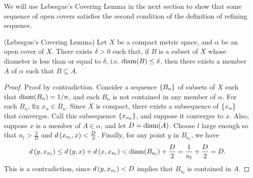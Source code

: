 \documentclass[12pt,twoside,draft]{book}
\begin{document}
We will use Lebesgue's Covering Lemma in the next section to show that some sequence of open covers satisfies the second condition of the definition of refining sequence.
\begin{lemma}
  (Lebesgue's Covering Lemma)
  Let $X$ be a compact metric space, and $\alpha$ be an open cover of $X$.
  There exists $\delta > 0$ such that, if $B$ is a subset of $X$ whose diameter is less than or equal to $\delta$, i.e. $\mathrm{diam}(B) \leq \delta$, then there exists a member $A$ of $\alpha$ such that $B \subseteq A$.
  \label{lem:covering}

    \begin{proof}
    Proof by contradiction.
    Consider a sequence $\left \{ B_n \right \}$ of subsets of $X$ such that $\mathrm{diam}(B_n) = 1/n$, and each $B_n$ is not contained in any member of $\alpha$.
    For each $B_n$, fix $x_n \in B_n$.
    Since $X$ is compact, there exists a subsequence of $\left \{ x_n \right \}$ that converges.
    Call this subsequence $\left \{ x_{n_k} \right \}$, and suppose it converges to $x$.
    Also, suppose $x$ is a member of $A \in \alpha$, and let $D = \mathrm{diam}(A)$.
    Choose $l$ large enough so that $n_l > \frac{2}{D}$ and $d\left( x_{n_l}, x \right) < \frac{D}{2}$.
    Finally, for any point $y$ in $B_{n_l}$, we have
    \begin{equation*}
      d\left( y, x_{n_l} \right)
      \leq d\left( y,x \right) + d\left( x, x_{n_l} \right)
      < \mathrm{diam}(B_{n_l})  + \frac{D}{2}
      = \frac{1}{n_l} + \frac{D}{2}
      = D.
    \end{equation*}
    This is a contradiction, since $d\left( y, x_{n_l} \right) < D$ implies that $B_{n_l}$ is contained in $A$.
  \end{proof}
\end{lemma}
\end{document}
